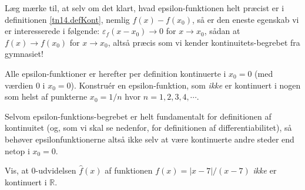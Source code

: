 \begin{aha}
Læg mærke til, at selv om det klart, hvad epsilon-funktionen helt præcist er i definitionen \ref{tn14.defKont}, nemlig $f(x) - f(x_{0})$, så er den eneste egenskab vi er interesserede i følgende:
$\varepsilon_{f}(x - x_{0}) \to 0$ for $ x \to x_{0}$, sådan at $f(x) \to f(x_{0})$ for $x \to x_{0}$,
altså præcis som vi kender kontinuitets-begrebet fra gymnasiet!
\end{aha}

\begin{exercise} \label{tn14.exercNonKontEps}
Alle epsilon-funktioner er herefter per definition kontinuerte i $x_{0} = 0$ (med værdien $0$ i $x_{0}=0$). Konstru\'{e}r en epsilon-funktion, som \emph{ikke} er kontinuert i nogen som helst af punkterne $x_{0} = 1/n$ hvor $n = 1, 2, 3, 4, \cdots$.
\end{exercise}

\begin{aha}
Selvom epsilon-funktions-begrebet er helt fundamentalt for definitionen af kontinuitet (og, som vi skal se nedenfor, for definitionen af differentiabilitet), så behøver epsilonfunktionerne altså ikke selv at være kontinuerte andre steder end netop i $x_{0}=0$.
\end{aha}

\begin{exercise} \label{tn14.exercNumDiv}
Vis, at $0$-udvidelsen $\widehat{f}(x)$ af funktionen $f(x) = |x-7|/(x-7)$ \emph{ikke} er kontinuert i $\mathbb{R}$.
\end{exercise}




